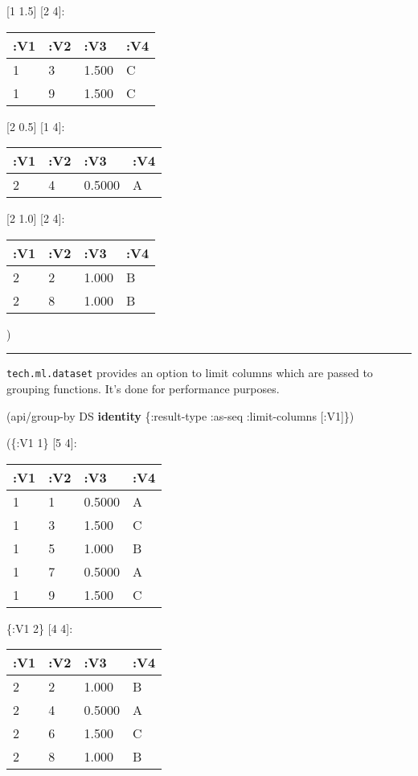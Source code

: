 \documentclass[]{article}
\newenvironment{Shaded}{\begin{snugshade}}{\end{snugshade}}
\newcommand{\KeywordTok}[1]{\textcolor[rgb]{0.13,0.29,0.53}{\textbf{#1}}}
\newcommand{\AttributeTok}[1]{\textcolor[rgb]{0.77,0.63,0.00}{#1}}
\newcommand{\NormalTok}[1]{#1}
\begin{document}
{[}1 1.5{]} {[}2 4{]}:

\begin{longtable}[]{@{}llll@{}}
\toprule
:V1 & :V2 & :V3 & :V4\tabularnewline
\midrule
\endhead
1 & 3 & 1.500 & C\tabularnewline
1 & 9 & 1.500 & C\tabularnewline
\bottomrule
\end{longtable}

{[}2 0.5{]} {[}1 4{]}:

\begin{longtable}[]{@{}llll@{}}
\toprule
:V1 & :V2 & :V3 & :V4\tabularnewline
\midrule
\endhead
2 & 4 & 0.5000 & A\tabularnewline
\bottomrule
\end{longtable}

{[}2 1.0{]} {[}2 4{]}:

\begin{longtable}[]{@{}llll@{}}
\toprule
:V1 & :V2 & :V3 & :V4\tabularnewline
\midrule
\endhead
2 & 2 & 1.000 & B\tabularnewline
2 & 8 & 1.000 & B\tabularnewline
\bottomrule
\end{longtable}

)

\begin{center}\rule{0.5\linewidth}{0.5pt}\end{center}

\texttt{tech.ml.dataset} provides an option to limit columns which are
passed to grouping functions. It's done for performance purposes.

\begin{Shaded}
\begin{Highlighting}[]
\NormalTok{(api/group-by DS }\KeywordTok{identity}\NormalTok{ \{}\AttributeTok{:result-type} \AttributeTok{:as-seq}
                           \AttributeTok{:limit-columns}\NormalTok{ [}\AttributeTok{:V1}\NormalTok{]\})}
\end{Highlighting}
\end{Shaded}

(\{:V1 1\} {[}5 4{]}:

\begin{longtable}[]{@{}llll@{}}
\toprule
:V1 & :V2 & :V3 & :V4\tabularnewline
\midrule
\endhead
1 & 1 & 0.5000 & A\tabularnewline
1 & 3 & 1.500 & C\tabularnewline
1 & 5 & 1.000 & B\tabularnewline
1 & 7 & 0.5000 & A\tabularnewline
1 & 9 & 1.500 & C\tabularnewline
\bottomrule
\end{longtable}

\{:V1 2\} {[}4 4{]}:

\begin{longtable}[]{@{}llll@{}}
\toprule
:V1 & :V2 & :V3 & :V4\tabularnewline
\midrule
\endhead
2 & 2 & 1.000 & B\tabularnewline
2 & 4 & 0.5000 & A\tabularnewline
2 & 6 & 1.500 & C\tabularnewline
2 & 8 & 1.000 & B\tabularnewline
\bottomrule
\end{longtable}
\end{document}
